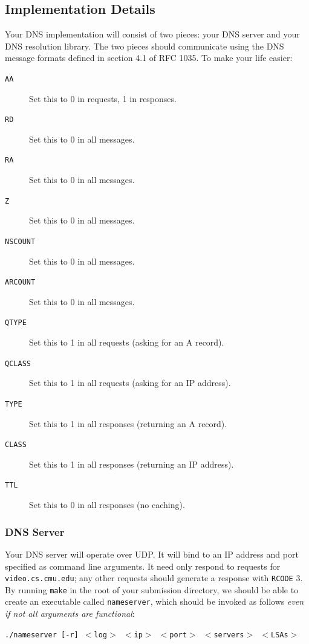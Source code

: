 \documentclass{article}
\newcommand{\theurl}{\texttt{video.cs.cmu.edu}}
\begin{document}
\subsection{Implementation Details}
\label{sec:dns-details}

Your DNS implementation will consist of two pieces: your DNS server and your
DNS resolution library. The two pieces should communicate using the DNS message
formats defined in section 4.1 of RFC 1035. To make your life easier:

\begin{description}
	\item[\texttt{AA}] Set this to 0 in requests, 1 in responses.
	\item[\texttt{RD}] Set this to 0 in all messages.
	\item[\texttt{RA}] Set this to 0 in all messages.
	\item[\texttt{Z}] Set this to 0 in all messages.
	\item[\texttt{NSCOUNT}] Set this to 0 in all messages.
	\item[\texttt{ARCOUNT}] Set this to 0 in all messages.
	\item[\texttt{QTYPE}] Set this to 1 in all requests (asking for an A record).
	\item[\texttt{QCLASS}] Set this to 1 in all requests (asking for an IP address).
	\item[\texttt{TYPE}] Set this to 1 in all responses (returning an A record).
	\item[\texttt{CLASS}] Set this to 1 in all responses (returning an IP address).
	\item[\texttt{TTL}] Set this to 0 in all responses (no caching).
\end{description}


\subsubsection{DNS Server}
\label{sec:dns-server-details}

Your DNS server will operate over UDP. It will bind to an IP address and port
specified as command line arguments. It need only respond to requests for
\theurl; any other requests should generate a response with \texttt{RCODE} 3.
By running \texttt{make} in the root of your submission directory, we should be
able to create an executable called \texttt{nameserver}, which should be
invoked as follows \emph{even if not all arguments are functional}:
\begin{center}
	\texttt{./nameserver [-r] $<$log$>$ $<$ip$>$ $<$port$>$ $<$servers$>$ $<$LSAs$>$}
\end{center}
\end{document}
